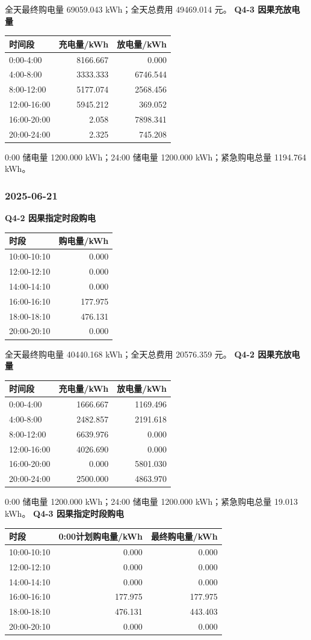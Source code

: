 全天最终购电量 69059.043 kWh；全天总费用 49469.014 元。
\textbf{Q4-3 因果充放电量}
\begin{longtable}[]{@{}lrr@{}}\toprule 时间段&充电量/kWh&放电量/kWh\\\midrule\endhead
0:00-4:00&8166.667&0.000\\4:00-8:00&3333.333&6746.544\\8:00-12:00&5177.074&2568.456\\12:00-16:00&5945.212&369.052\\16:00-20:00&2.058&7898.341\\20:00-24:00&2.325&745.208\\\bottomrule\end{longtable}
0:00 储电量 1200.000 kWh；24:00 储电量 1200.000 kWh；紧急购电总量 1194.764 kWh。

\subsubsection{2025-06-21}
\textbf{Q4-2 因果指定时段购电}
\begin{longtable}[]{@{}lr@{}}\toprule 时段&购电量/kWh\\\midrule\endhead
10:00-10:10&0.000\\12:00-12:10&0.000\\14:00-14:10&0.000\\16:00-16:10&177.975\\18:00-18:10&476.131\\20:00-20:10&0.000\\\bottomrule\end{longtable}
全天最终购电量 40440.168 kWh；全天总费用 20576.359 元。
\textbf{Q4-2 因果充放电量}
\begin{longtable}[]{@{}lrr@{}}\toprule 时间段&充电量/kWh&放电量/kWh\\\midrule\endhead
0:00-4:00&1666.667&1169.496\\4:00-8:00&2482.857&2191.618\\8:00-12:00&6639.976&0.000\\12:00-16:00&4026.690&0.000\\16:00-20:00&0.000&5801.030\\20:00-24:00&2500.000&4863.970\\\bottomrule\end{longtable}
0:00 储电量 1200.000 kWh；24:00 储电量 1200.000 kWh；紧急购电总量 19.013 kWh。
\textbf{Q4-3 因果指定时段购电}
\begin{longtable}[]{@{}lrr@{}}\toprule 时段&0:00计划购电量/kWh&最终购电量/kWh\\\midrule\endhead
10:00-10:10&0.000&0.000\\12:00-12:10&0.000&0.000\\14:00-14:10&0.000&0.000\\16:00-16:10&177.975&177.975\\18:00-18:10&476.131&443.403\\20:00-20:10&0.000&0.000\\\bottomrule\end{longtable}
